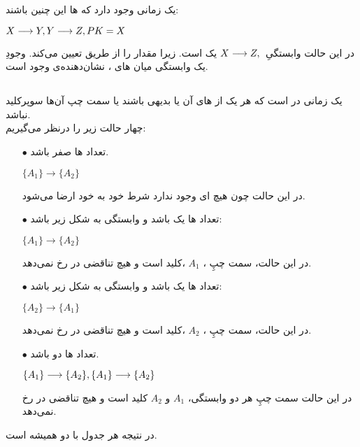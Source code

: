 \documentclass{article}
\begin{document}
\subsection{}
یک  زمانی وجود دارد که ها این چنین باشند:
\begin{latin}
$
\\
X\longrightarrow Y,\\
Y\longrightarrow Z,\\
PK=X\\
\\
$
\end{latin}
در این حالت وابستگیِ
$
X\longrightarrow Z,\\
$
یک  است. زیرا  مقدار  را از طریق 
 تعیین می‌کند. وجودِ یک وابستگی میان های ، نشان‌دهنده‌ی وجود  است.
\subsection{}
یک  زمانی در  است که هر یک از های آن یا بدیهی باشند یا سمت چپ آن‌ها سوپرکلید نباشد.
\\
چهار حالت زیر را درنظر می‌گیریم:
\begin{itemize}
    \item [$\bullet$] تعداد ها صفر باشد.

\begin{latin}
$
\{A_{1}\}\longrightarrow\{A_{2}\}
$
\end{latin}
در این حالت چون هیچ ای وجود ندارد شرط  خود به خود ارضا می‌شود.
%
    \item [$\bullet$] تعداد ها یک باشد و وابستگی به شکل زیر باشد:

\begin{latin}
$
\{A_{1}\}\longrightarrow\{A_{2}\}
$
\end{latin}
در این حالت، سمت چپِ ،
$
A_{1}
$
،کلید است و هیچ تناقضی در  رخ نمی‌دهد.
%
    \item [$\bullet$] تعداد ها یک باشد و وابستگی به شکل زیر باشد:

\begin{latin}
$
\{A_{2}\}\longrightarrow\{A_{1}\}
$
\end{latin}
در این حالت، سمت چپِ ،
$
A_{2}
$
،کلید است و هیچ تناقضی در  رخ نمی‌دهد.
%
    \item [$\bullet$] تعداد ها دو باشد.

\begin{latin}

$
\{A_{1}\}\longrightarrow\{A_{2}\},\\
\{A_{1}\}\longrightarrow\{A_{2}\}
$
\end{latin}
در این حالت سمت چپِ هر دو وابستگی،
$
A_{1}
$
و
$
A_{2}
$
کلید است و هیچ تناقضی در  رخ نمی‌دهد.
\end{itemize}
در نتیجه هر جدول با دو  همیشه  است.
\end{document}
